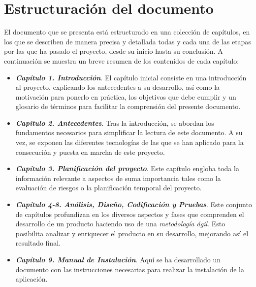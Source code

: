 

\section{Estructuración del documento}
El documento que se presenta está estructurado en una colección de capítulos, 
en los que se describen de manera precisa y detallada todas y cada una de 
las etapas por las que ha pasado el proyecto, desde su inicio hasta su 
conclusión. A continuación se muestra un breve resumen de los contenidos 
de cada capítulo:

\begin{itemize}
    \item \textbf{\emph{Capítulo 1. Introducción}}. El capítulo inicial 
    consiste en una introducción al proyecto, explicando los antecedentes 
    a su desarrollo, así como la motivación para ponerlo en práctica, los 
    objetivos que debe cumplir y un glosario de términos para facilitar 
    la comprensión del presente documento.

    \item \textbf{\emph{Capítulo 2. Antecedentes}}. Tras la introducción,
    se abordan los fundamentos necesarios para simplificar la lectura de 
    este documento. A su vez, se exponen las diferentes tecnologías de las 
    que se han aplicado para la consecución y puesta en marcha de este 
    proyecto.

    \item \textbf{\emph{Capítulo 3. Planificación del proyecto}}. Este 
    capítulo engloba toda la información relevante a aspectos de 
    suma importancia tales como la evaluación de riesgos o la planificación 
    temporal del proyecto.

    \item \textbf{\emph{Capítulo 4-\@8. Análisis, Diseño, Codificación y 
    Pruebas}}. Este conjunto de capítulos profundizan en los diversos 
    aspectos y fases que comprenden el desarrollo de un producto haciendo 
    uso de una \emph{metodología ágil}. Esto posibilita analizar y 
    enriquecer el producto en su desarrollo, mejorando así el resultado 
    final.

    \item \textbf{\emph{Capítulo 9. Manual de Instalación}}. Aquí se 
    ha desarrollado un documento con las instrucciones necesarias 
    para realizar la instalación de la aplicación.


\end{itemize}
